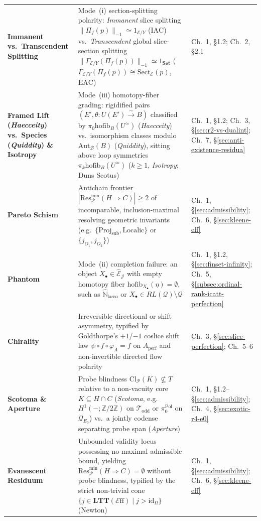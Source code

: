 \documentclass[10pt,twoside,openright]{book}
\theoremstyle{crmplain}
\theoremstyle{crmdef}
\theoremstyle{crmremark}
\newcommand{\Eff}{\mathcal{E}\mathrm{ff}}
\begin{document}
{\begin{xltabular}{\textwidth}{@{}>{\bfseries}P{0.25\textwidth}YP{0.20\textwidth}@{}}
Immanent vs.\ Transcendent Splitting & Mode~(i) section-splitting polarity: \emph{Immanent} slice splitting $\|\Pi_f(p)\|_{-1} \simeq 1_{\mathcal{E}/Y}$ ($\mathrm{IAC}$) vs.\ \emph{Transcendent} global slice-section splitting $\|\Gamma_{\mathcal{E}/Y}(\Pi_f(p))\|_{-1} \simeq 1_{\mathbf{Set}}$ ($\Gamma_{\mathcal{E}/Y}(\Pi_f(p)) \cong \mathrm{Sect}_{\mathcal{E}}(p)$, $\mathrm{EAC}$) & Ch.~1, \S1.2; Ch.~2, \S2.1 \\
Framed Lift (\emph{Haecceity}) vs.\ Species (\emph{Quiddity}) \& Isotropy & Mode~(iii) homotopy-fiber grading: rigidified pairs $(E', \theta : U(E') \xrightarrow{\sim} B)$ classified by $\pi_0\mathrm{hofib}_B(U^{\simeq})$ (\emph{Haecceity}) vs.\ isomorphism classes modulo $\mathrm{Aut}_{\mathcal{B}}(B)$ (\emph{Quiddity}), sitting above loop symmetries $\pi_k\mathrm{hofib}_B(U^{\simeq})$ ($k \ge 1$, \emph{Isotropy}; Duns Scotus) & Ch.~1, \S1.2; Ch.~3, \S\ref{sec:r2-vs-dualint}; Ch.~7, \S\ref{sec:anti-existence-residua} \\
Pareto Schism & Antichain frontier $|\mathrm{Res}_{\mathcal{P}}^{\min}(H \Rightarrow C)| \ge 2$ of incomparable, inclusion-maximal resolving geometric invariants (e.g.\ $\{\mathrm{Proj}_{\mathrm{sub}}, \mathrm{Localic}\}$ or $\{j_{O_1}, j_{O_2}\}$) & Ch.~1, \S\ref{sec:admissibility}; Ch.~6, \S\ref{sec:kleene-eff} \\
Phantom & Mode~(ii) completion failure: an object $X_\bullet \in \widehat{\mathcal{E}}_{\mathcal{J}}$ with empty homotopy fiber $\mathrm{hofib}_{X_\bullet}(\eta) = \emptyset$, such as $\widehat{\mathbb{N}}_{\mathrm{lasso}}$ or $X_\bullet \in RL(\mathcal{Q}) \setminus \mathcal{Q}$ & Ch.~1, \S1.2, \S\ref{sec:finset-infinity}; Ch.~5, \S\ref{subsec:ordinal-rank-icatt-perfection} \\
Chirality & Irreversible directional or shift asymmetry, typified by Goldthorpe's $+1$/$-1$ coslice shift law $\psi \circ f \circ \varphi_A = f$ on $A_{\mathrm{perf}}$ and non-invertible directed flow polarity & Ch.~3, \S\ref{sec:slice-perfection}; Ch.~5--6 \\
Scotoma \& Aperture & Probe blindness $\mathrm{Cl}_{\mathcal{P}}(K) \not\subseteq T$ relative to a non-vacuity core $K \subseteq H \cap C$ (\emph{Scotoma}, e.g.\ $H^1(-;\mathbb{Z}/2\mathbb{Z})$ on $\mathcal{T}_{\mathrm{odd}}$ or $\pi_0^{\mathrm{Pol}}$ on $\mathcal{Q}_{E_0}$) vs.\ a jointly codense separating probe span (\emph{Aperture}) & Ch.~1, \S1.2--\S\ref{sec:admissibility}; Ch.~4, \S\ref{sec:exotic-r4-e0} \\
Evanescent Residuum & Unbounded validity locus possessing no maximal admissible bound, yielding $\mathrm{Res}_{\mathcal{P}}^{\min}(H \Rightarrow C) = \emptyset$ without probe blindness, typified by the strict non-trivial cone $\{j \in \mathbf{LTT}(\Eff) \mid j > \mathrm{id}_\Omega\}$ (Newton) & Ch.~1, \S\ref{sec:admissibility}; Ch.~6, \S\ref{sec:kleene-eff} \\

\end{xltabular}}
\end{document}
